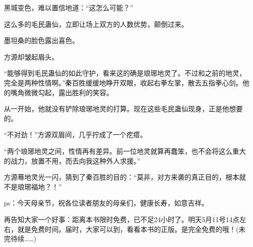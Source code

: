 \begin{this_body}
黑城变色，难以置信地道：“这怎么可能？”

这么多的毛民蛊仙，立即让场上双方的人数优势，颠倒过来。

墨坦桑的脸色露出喜色。

方源却皱起眉头。

“能够得到毛民蛊仙的如此守护，看来这的确是琅琊地灵了。不过和之前的地灵，完全是两种性情啊。”秦百胜缓缓地睁开双眼，收起右拳左掌，散去五指拳心剑。他的嘴角微微勾起，露出胜利的笑容。

从一开始，他就没有铲除琅琊地灵的打算。现在这些毛民蛊仙现身，正是他想要的。

“不对劲！”方源双眉间，几乎拧成了一个疙瘩。

“两个琅琊地灵之间，性情再有差异。前一位地灵就算再蠢笨，也不会将这么重大的战力，放置不用，而去向我这种外人求援。”

方源蓦地灵光一闪，猜到了秦百胜的目的：“莫非，对方来袭的真正目的，根本就不是琅琊福地？！”

ps：今天母亲节，祝各位读者朋友的母亲们，健康长寿，如意吉祥。

再告知大家一个好事：距离本书限时免费，已不足24小时了。明天5月11号14点左右，就是免费时间。届时，大家可以到，看看本书的正版。是完全免费的哦！(未完待续……)

\end{this_body}

